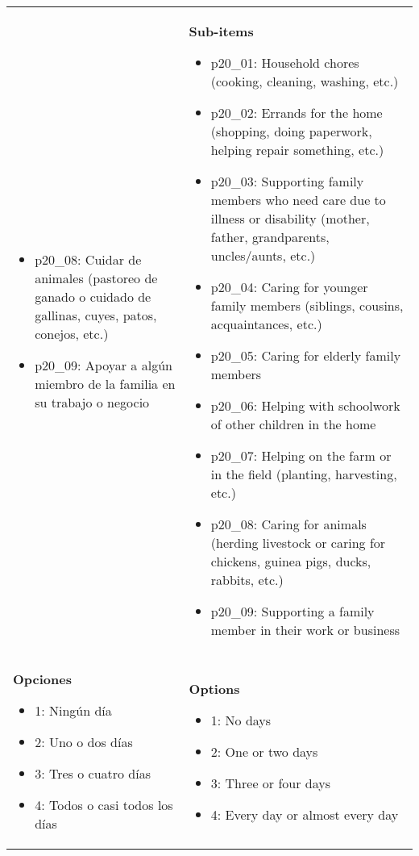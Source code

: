 \documentclass[11pt]{article}
\begin{document}
\begin{longtable}{@{}LL@{}}
\begin{itemize}[leftmargin=*]
\item p20\_08: Cuidar de animales (pastoreo de ganado o cuidado de gallinas, cuyes, patos, conejos, etc.)
\item p20\_09: Apoyar a algún miembro de la familia en su trabajo o negocio\end{itemize} & \textbf{Sub-items}\par\begin{itemize}[leftmargin=*]\item p20\_01: Household chores (cooking, cleaning, washing, etc.)
\item p20\_02: Errands for the home (shopping, doing paperwork, helping repair something, etc.)
\item p20\_03: Supporting family members who need care due to illness or disability (mother, father, grandparents, uncles/aunts, etc.)
\item p20\_04: Caring for younger family members (siblings, cousins, acquaintances, etc.)
\item p20\_05: Caring for elderly family members
\item p20\_06: Helping with schoolwork of other children in the home
\item p20\_07: Helping on the farm or in the field (planting, harvesting, etc.)
\item p20\_08: Caring for animals (herding livestock or caring for chickens, guinea pigs, ducks, rabbits, etc.)
\item p20\_09: Supporting a family member in their work or business\end{itemize} \\
\textbf{Opciones}\par\begin{itemize}[leftmargin=*]\item 1: Ningún día
\item 2: Uno o dos días
\item 3: Tres o cuatro días
\item 4: Todos o casi todos los días\end{itemize} & \textbf{Options}\par\begin{itemize}[leftmargin=*]\item 1: No days
\item 2: One or two days
\item 3: Three or four days
\item 4: Every day or almost every day\end{itemize} \\

\end{longtable}
\end{document}
